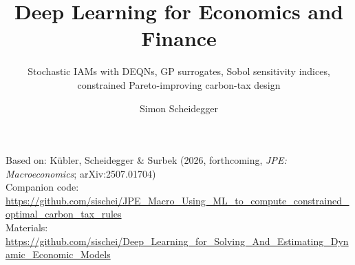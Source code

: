 \documentclass[aspectratio=1610]{beamer}
\title[Deep Learning for Dynamic Economic Models]{Deep Learning for Economics and Finance}
\subtitle{Stochastic IAMs with DEQNs, GP surrogates, Sobol sensitivity indices, constrained Pareto-improving carbon-tax design}
\author{Simon Scheidegger}
\institute[HEC Lausanne]{HEC, University of Lausanne}
\date{}
\begin{document}
{
\begin{frame}
\titlepage
\vspace{-0.4cm}
\begin{center}
{\footnotesize Based on: K\"ubler, Scheidegger \& Surbek (2026, forthcoming, \textit{JPE: Macroeconomics}; arXiv:2507.01704)}\\[2pt]
{\footnotesize Companion code: \url{https://github.com/sischei/JPE_Macro_Using_ML_to_compute_constrained_optimal_carbon_tax_rules}}\\[4pt]
{\footnotesize Materials: \url{https://github.com/sischei/Deep_Learning_for_Solving_And_Estimating_Dynamic_Economic_Models}}
\end{center}
\end{frame}
}

\end{document}
